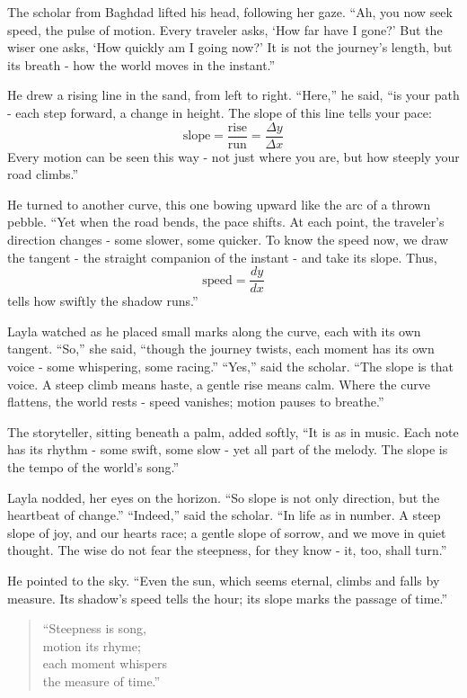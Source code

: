 \documentclass[
  letterpaper,
  DIV=11,
  numbers=noendperiod]{scrreprt}
\begin{document}
The scholar from Baghdad lifted his head, following her gaze. ``Ah, you
now seek speed, the pulse of motion. Every traveler asks, `How far have
I gone?' But the wiser one asks, `How quickly am I going now?' It is not
the journey's length, but its breath - how the world moves in the
instant.''

He drew a rising line in the sand, from left to right. ``Here,'' he
said, ``is your path - each step forward, a change in height. The slope
of this line tells your pace: \[
\text{slope} = \frac{\text{rise}}{\text{run}} = \frac{\Delta y}{\Delta x}
\] Every motion can be seen this way - not just where you are, but how
steeply your road climbs.''

He turned to another curve, this one bowing upward like the arc of a
thrown pebble. ``Yet when the road bends, the pace shifts. At each
point, the traveler's direction changes - some slower, some quicker. To
know the speed now, we draw the tangent - the straight companion of the
instant - and take its slope. Thus, \[
\text{speed} = \frac{dy}{dx}
\] tells how swiftly the shadow runs.''

Layla watched as he placed small marks along the curve, each with its
own tangent. ``So,'' she said, ``though the journey twists, each moment
has its own voice - some whispering, some racing.'' ``Yes,'' said the
scholar. ``The slope is that voice. A steep climb means haste, a gentle
rise means calm. Where the curve flattens, the world rests - speed
vanishes; motion pauses to breathe.''

The storyteller, sitting beneath a palm, added softly, ``It is as in
music. Each note has its rhythm - some swift, some slow - yet all part
of the melody. The slope is the tempo of the world's song.''

Layla nodded, her eyes on the horizon. ``So slope is not only direction,
but the heartbeat of change.'' ``Indeed,'' said the scholar. ``In life
as in number. A steep slope of joy, and our hearts race; a gentle slope
of sorrow, and we move in quiet thought. The wise do not fear the
steepness, for they know - it, too, shall turn.''

He pointed to the sky. ``Even the sun, which seems eternal, climbs and
falls by measure. Its shadow's speed tells the hour; its slope marks the
passage of time.''

\begin{quote}
``Steepness is song,\\
motion its rhyme;\\
each moment whispers\\
the measure of time.''
\end{quote}
\end{document}
